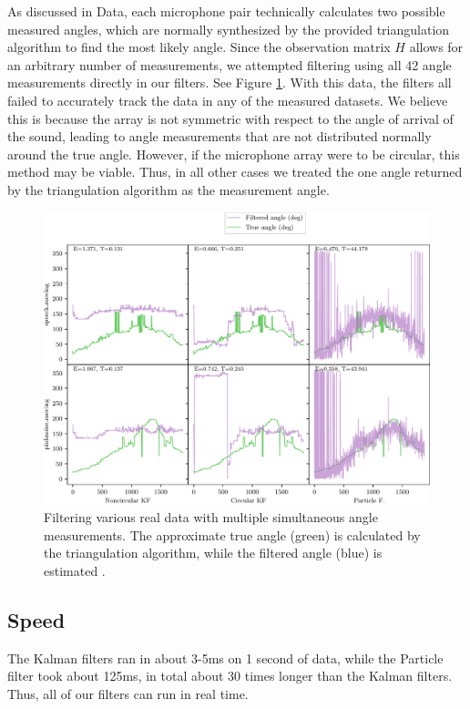\documentclass[11pt]{amsart}
\begin{document}
As discussed in Data, each microphone pair technically calculates two possible measured angles, which are normally synthesized by the provided triangulation algorithm to find the most likely angle. Since the observation matrix $H$ allows for an arbitrary number of measurements, we attempted filtering using all 42 angle measurements directly in our filters.  
See Figure \ref{fig:multiple_angles}. 
With this data, the filters all failed to accurately track the data in any of the measured datasets. We believe this is because the array is not symmetric with respect to the angle of arrival of the sound, leading to angle measurements that are not distributed normally around the true angle. However, if the microphone array were to be circular, this method may be viable. Thus, in all other cases we treated the one angle returned by the triangulation algorithm as the measurement angle.

\begin{figure}[htp]
    \centering
    \includegraphics[width=.75\textwidth]{actual_paper_graphs/multiple_angles.pdf}\hfill
    \caption{Filtering various real data with multiple simultaneous angle measurements. The approximate true angle (green) is calculated by the triangulation algorithm, while the filtered angle (blue) is estimated .}
    \label{fig:multiple_angles}
\end{figure}

\subsection{Speed}
The Kalman filters ran in about 3-5ms on 1 second of data, while the Particle filter took about 125ms, in total about $30$ times longer than the Kalman filters.
Thus, all of our filters can run in real time. 
\end{document}
